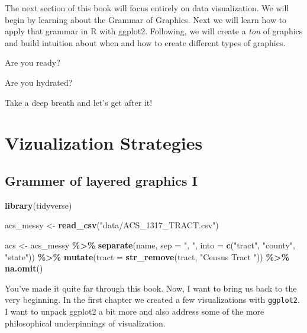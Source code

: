 \documentclass[
]{book}
\newenvironment{Shaded}{\begin{snugshade}}{\end{snugshade}}
\newcommand{\DataTypeTok}[1]{\textcolor[rgb]{0.13,0.29,0.53}{#1}}
\newcommand{\KeywordTok}[1]{\textcolor[rgb]{0.13,0.29,0.53}{\textbf{#1}}}
\newcommand{\NormalTok}[1]{#1}
\newcommand{\OperatorTok}[1]{\textcolor[rgb]{0.81,0.36,0.00}{\textbf{#1}}}
\newcommand{\StringTok}[1]{\textcolor[rgb]{0.31,0.60,0.02}{#1}}
\begin{document}
The next section of this book will focus entirely on data visualization. We will begin by learning about the Grammar of Graphics. Next we will learn how to apply that grammar in R with ggplot2. Following, we will create a \emph{ton} of graphics and build intuition about when and how to create different types of graphics.

Are you ready?

Are you hydrated?

Take a deep breath and let's get after it!

\hypertarget{part-vizualization-strategies}{%
\part{Vizualization Strategies}\label{part-vizualization-strategies}}

\hypertarget{layered-i}{%
\chapter{Grammer of layered graphics I}\label{layered-i}}

\begin{Shaded}
\begin{Highlighting}[]
\KeywordTok{library}\NormalTok{(tidyverse)}

\NormalTok{acs\_messy \textless{}{-}}\StringTok{ }\KeywordTok{read\_csv}\NormalTok{(}\StringTok{"data/ACS\_1317\_TRACT.csv"}\NormalTok{)}

\NormalTok{acs \textless{}{-}}\StringTok{ }\NormalTok{acs\_messy }\OperatorTok{\%\textgreater{}\%}\StringTok{ }
\StringTok{  }\KeywordTok{separate}\NormalTok{(name, }\DataTypeTok{sep =} \StringTok{", "}\NormalTok{, }\DataTypeTok{into =} \KeywordTok{c}\NormalTok{(}\StringTok{"tract"}\NormalTok{, }\StringTok{"county"}\NormalTok{, }\StringTok{"state"}\NormalTok{)) }\OperatorTok{\%\textgreater{}\%}\StringTok{ }
\StringTok{  }\KeywordTok{mutate}\NormalTok{(}\DataTypeTok{tract =} \KeywordTok{str\_remove}\NormalTok{(tract, }\StringTok{"Census Tract "}\NormalTok{)) }\OperatorTok{\%\textgreater{}\%}\StringTok{ }
\StringTok{  }\KeywordTok{na.omit}\NormalTok{()}
\end{Highlighting}
\end{Shaded}

You've made it quite far through this book. Now, I want to bring us back to the very beginning. In the first chapter we created a few visualizations with \texttt{ggplot2}. I want to unpack ggplot2 a bit more and also address some of the more philosophical underpinnings of visualization.
\end{document}
